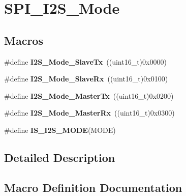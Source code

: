 \hypertarget{group___s_p_i___i2_s___mode}{}\section{S\+P\+I\+\_\+\+I2\+S\+\_\+\+Mode}
\label{group___s_p_i___i2_s___mode}
\subsection*{Macros}
\begin{DoxyCompactItemize}
\item 
\mbox{\label{group___s_p_i___i2_s___mode_gadd5b20277198fcdb6aa53ea48e802ae5}} 
\#define {\bfseries I2\+S\+\_\+\+Mode\+\_\+\+Slave\+Tx}~((uint16\+\_\+t)0x0000)
\item 
\mbox{\label{group___s_p_i___i2_s___mode_gaaf62ee0353476afc9612dc2933e1c5c5}} 
\#define {\bfseries I2\+S\+\_\+\+Mode\+\_\+\+Slave\+Rx}~((uint16\+\_\+t)0x0100)
\item 
\mbox{\label{group___s_p_i___i2_s___mode_ga3a62ee8964033a3f6fd030da9e40fba6}} 
\#define {\bfseries I2\+S\+\_\+\+Mode\+\_\+\+Master\+Tx}~((uint16\+\_\+t)0x0200)
\item 
\mbox{\label{group___s_p_i___i2_s___mode_gabf9f872cda7c0f159c5fc18aed44e973}} 
\#define {\bfseries I2\+S\+\_\+\+Mode\+\_\+\+Master\+Rx}~((uint16\+\_\+t)0x0300)
\item 
\#define {\bfseries I\+S\+\_\+\+I2\+S\+\_\+\+M\+O\+DE}(M\+O\+DE)
\end{DoxyCompactItemize}


\subsection{Detailed Description}


\subsection{Macro Definition Documentation}
\mbox{\label{group___s_p_i___i2_s___mode_ga942c37b2c1274c4c5773ddcf8b46d9b5}} 
